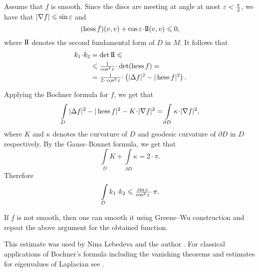 Assume that $f$ is smooth.
Since the discs are meeting at angle at most $\varepsilon<\tfrac\pi2$,
we have that $|\nabla f|\leqslant \sin\varepsilon$ and 
\[(\Hess f)(v,v)+ \cos\eps \cdot \2(v,v)\le 0,\]
where $\mathrm{I{\hskip-.1em}I}$ denotes the second fundamental form of $D$ in $M$.
It follows that
\begin{align*}
k_1\cdot k_2&=\det \2\le
\\
&\le \tfrac1{\cos^2\eps}\cdot \det(\Hess f)=
\\
&=\tfrac1{2\cdot\cos^2\eps}\cdot\left(|\Delta f|^2
-|\Hess f|^2\right).
\end{align*}


Applying the Bochner formula for $f$, we get that
\[\int\limits_D |\Delta f|^2
-|\Hess f|^2
-K\cdot|\nabla f|^2
=\int\limits_{\partial D}
\kappa\cdot|\nabla f|^2,\]
where $K$ and $\kappa$ denotes the curvature of $D$ and geodesic curvature of $\partial D$ in $D$ respectively.
By the Gauss--Bonnet formula, we get that
\[\int\limits_D 
K+\int\limits_{\partial D}\kappa=2\cdot\pi.\]
Therefore
\[\int\limits_Dk_1\cdot k_2\le \tfrac{\sin \eps}{\cos^2\eps}\cdot\pi.\]

If $f$ is not smooth, then one can smooth it using Greene--Wu construction \cite[Theorem~2]{greene-wu} and repeat the above argument for the obtained function.
\qedsf

This estimate was used by Nina Lebedeva and the author \cite{lebedeva-petrunin-curvature}.
For classical applications of Bochner's formula including the vanishing theorems and estimates for eigenvalues of Laplacian see \cite[][II \S 8 in]{lawson-michelsohn}.
